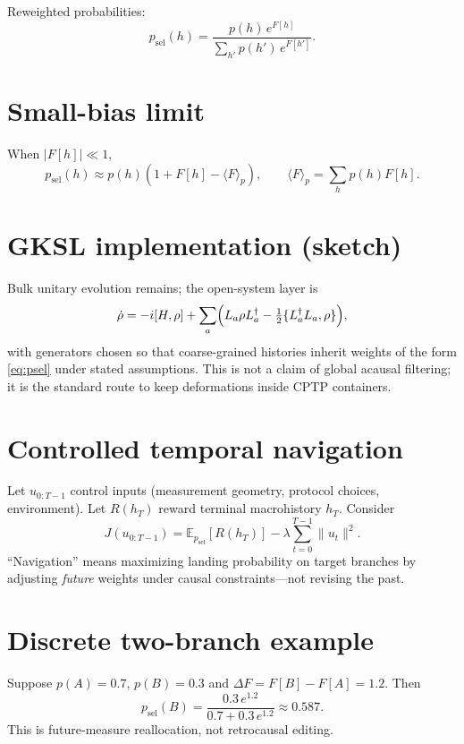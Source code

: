 \documentclass[11pt]{article}
\begin{document}
Reweighted probabilities:
\begin{equation}
p_{\mathrm{sel}}(h) = \frac{p(h) \, e^{F[h]}}{\sum_{h'} p(h') \, e^{F[h']}} .
\label{eq:psel}
\end{equation}

\section{Small-bias limit}
When $\lvert F[h] \rvert \ll 1$,
\begin{equation}
p_{\mathrm{sel}}(h) \approx p(h) \left( 1 + F[h] - \langle F \rangle_p \right), \qquad
\langle F \rangle_p = \sum_h p(h) F[h].
\end{equation}

\section{GKSL implementation (sketch)}
Bulk unitary evolution remains; the open-system layer is
\begin{equation}
\dot{\rho} = -i [H, \rho] + \sum_a \Bigl( L_a \rho L_a^\dagger - \tfrac{1}{2} \{ L_a^\dagger L_a, \rho \} \Bigr) ,
\end{equation}
with generators chosen so that coarse-grained histories inherit weights of the form \eqref{eq:psel} under stated assumptions. This is not a claim of global acausal filtering; it is the standard route to keep deformations inside CPTP containers.

\section{Controlled temporal navigation}
Let $u_{0:T-1}$ control inputs (measurement geometry, protocol choices, environment). Let $R(h_T)$ reward terminal macrohistory $h_T$. Consider
\begin{equation}
J(u_{0:T-1}) = \mathbb{E}_{p_{\mathrm{sel}}}[ R(h_T) ] - \lambda \sum_{t=0}^{T-1} \lVert u_t \rVert^2 .
\end{equation}
``Navigation'' means maximizing landing probability on target branches by adjusting \emph{future} weights under causal constraints---not revising the past.

\section{Discrete two-branch example}
Suppose $p(A)=0.7$, $p(B)=0.3$ and $\Delta F = F[B]-F[A]=1.2$. Then
\begin{equation}
p_{\mathrm{sel}}(B) = \frac{0.3 \, e^{1.2}}{0.7 + 0.3 \, e^{1.2}} \approx 0.587 .
\end{equation}
This is future-measure reallocation, not retrocausal editing.
\end{document}
